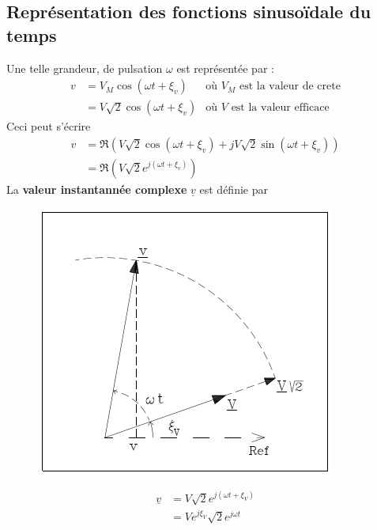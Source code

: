 \subsection{Représentation des fonctions sinusoïdale du temps}
Une telle grandeur, de pulsation $\omega$ est représentée par :
\begin{equation}
	\begin{array}{lll}
		v & = V_M\cos(\omega t + \xi_v)       & \text{où $V_M$ est la valeur de crete} \\
		  & = V\sqrt{2}\cos(\omega t + \xi_v) & \text{où $V$ est la valeur efficace}   
	\end{array}
\end{equation}
Ceci peut s'écrire 
\begin{equation}
	\begin{array}{ll}
		v & = \Re (V\sqrt{2}\cos(\omega t + \xi_v) + jV\sqrt{2}\sin(\omega t + \xi_v)) \\
		  & = \Re (V\sqrt{2}e^{j(\omega t + \xi_v)})                                    
	\end{array}
\end{equation}
La \textbf{valeur instantannée complexe} $\underline{v}$ est définie par \\
\begin{figure}
	\vspace{-15mm}
	\includegraphics[scale=0.4]{ch1/image2.png}
\end{figure}
\begin{equation}
	\begin{array}{ll}
		\underline{v} & = V \sqrt{2}e^{j(\omega t + \xi_V)} \\
		             & = V e^{j\xi_V}\sqrt{2}e^{j\omega t} 
	\end{array}
\end{equation}
